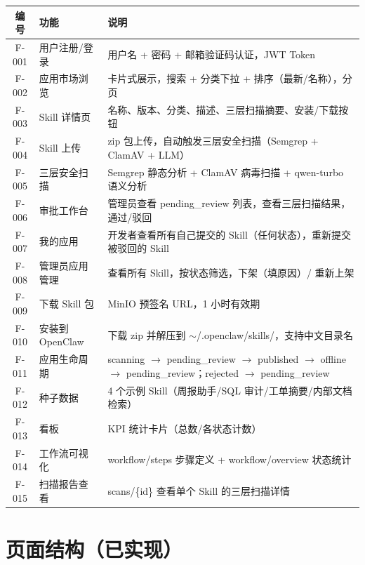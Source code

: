 \documentclass[11pt,a4paper]{article}
\begin{document}
\begin{table}[h]
\centering
\begin{tabularx}{\linewidth}{clX}
\toprule
\textbf{编号} & \textbf{功能} & \textbf{说明} \\
\midrule
F-001 & 用户注册/登录 & 用户名 + 密码 + 邮箱验证码认证，JWT Token \\
F-002 & 应用市场浏览 & 卡片式展示，搜索 + 分类下拉 + 排序（最新/名称），分页 \\
F-003 & Skill 详情页 & 名称、版本、分类、描述、三层扫描摘要、安装/下载按钮 \\
F-004 & Skill 上传 & zip 包上传，自动触发三层安全扫描（Semgrep + ClamAV + LLM） \\
F-005 & 三层安全扫描 & Semgrep 静态分析 + ClamAV 病毒扫描 + qwen-turbo 语义分析 \\
F-006 & 审批工作台 & 管理员查看 pending\_review 列表，查看三层扫描结果，通过/驳回 \\
F-007 & 我的应用 & 开发者查看所有自己提交的 Skill（任何状态），重新提交被驳回的 Skill \\
F-008 & 管理员应用管理 & 查看所有 Skill，按状态筛选，下架（填原因）/ 重新上架 \\
F-009 & 下载 Skill 包 & MinIO 预签名 URL，1 小时有效期 \\
F-010 & 安装到 OpenClaw & 下载 zip 并解压到 $\sim$/.openclaw/skills/，支持中文目录名 \\
F-011 & 应用生命周期 & scanning $\to$ pending\_review $\to$ published $\to$ offline $\to$ pending\_review；rejected $\to$ pending\_review \\
F-012 & 种子数据 & 4 个示例 Skill（周报助手/SQL 审计/工单摘要/内部文档检索） \\
F-013 & 看板 & KPI 统计卡片（总数/各状态计数） \\
F-014 & 工作流可视化 & workflow/steps 步骤定义 + workflow/overview 状态统计 \\
F-015 & 扫描报告查看 & scans/\{id\} 查看单个 Skill 的三层扫描详情 \\
\bottomrule
\end{tabularx}
\end{table}

\section{页面结构（已实现）}
\end{document}
